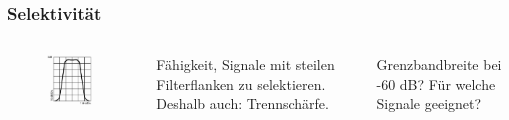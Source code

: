\begin{frame}
  \frametitle{Selektivität}

  \begin{columns}
    \begin{center}
      \begin{figure}
        \includegraphics[width=\textwidth,height=.7\textheight,keepaspectratio]{a18/TF410.png}
      \end{figure}
    \end{center}


    Fähigkeit, Signale mit steilen Filterflanken zu selektieren. Deshalb auch:
    Trennschärfe.

    \begin{exampleblock}{Grenzbandbreite bei -60 dB? Für welche Signale geeignet?}
    \end{exampleblock}

  \end{columns}

\end{frame}

